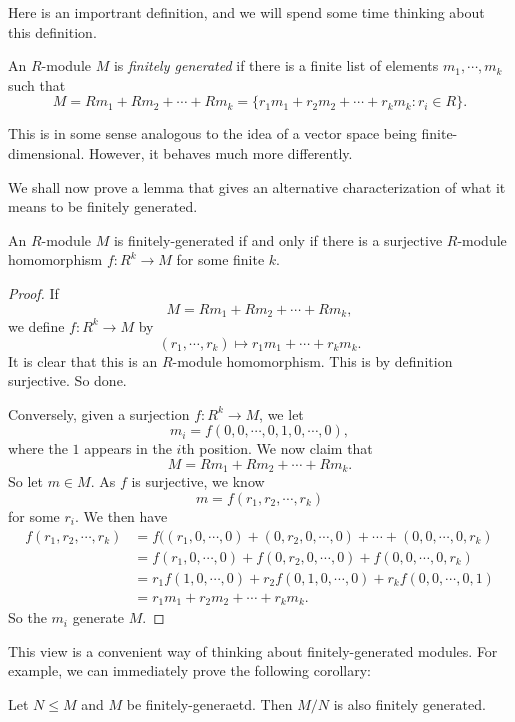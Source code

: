 \documentclass[a4paper]{article}
\begin{document}
Here is an importrant definition, and we will spend some time thinking about this definition.
\begin{defi}
  An $R$-module $M$ is \emph{finitely generated} if there is a finite list of elements $m_1, \cdots, m_k$ such that
  \[
    M = Rm_1 + Rm_2 + \cdots + Rm_k = \{r_1 m_1 + r_2 m_2 + \cdots + r_k m_k: r_i \in R\}.
  \]
\end{defi}
This is in some sense analogous to the idea of a vector space being finite-dimensional. However, it behaves much more differently.

We shall now prove a lemma that gives an alternative characterization of what it means to be finitely generated.

\begin{lemma}
  An $R$-module $M$ is finitely-generated if and only if there is a surjective $R$-module homomorphism $f: R^k \to M$ for some finite $k$.
\end{lemma}

\begin{proof}
  If
  \[
    M = R m_1 + R m_2 + \cdots + R m_k,
  \]
  we define $f: R^k \to M$ by
  \[
    (r_1, \cdots, r_k) \mapsto r_1 m_1 + \cdots + r_k m_k.
  \]
  It is clear that this is an $R$-module homomorphism. This is by definition surjective. So done.

  Conversely, given a surjection $f: R^k \to M$, we let
  \[
    m_i = f(0, 0, \cdots, 0, 1, 0, \cdots, 0),
  \]
  where the $1$ appears in the $i$th position. We now claim that
  \[
    M = R m_1 + R m_2 + \cdots + R m_k.
  \]
  So let $m \in M$. As $f$ is surjective, we know
  \[
    m = f(r_1, r_2, \cdots, r_k)
  \]
  for some $r_i$. We then have
  \begin{align*}
    f(r_1, r_2, \cdots, r_k) &= f((r_1, 0, \cdots, 0) + (0, r_2, 0, \cdots, 0) + \cdots + (0, 0, \cdots, 0, r_k)\\
    &= f(r_1, 0, \cdots, 0) + f(0, r_2, 0, \cdots, 0) + f(0, 0, \cdots, 0, r_k)\\
    &= r_1 f(1, 0, \cdots, 0) + r_2 f(0, 1, 0, \cdots, 0) + r_k f(0, 0, \cdots, 0, 1)\\
    &= r_1 m_1 + r_2 m_2 + \cdots + r_k m_k.
  \end{align*}
  So the $m_i$ generate $M$.
\end{proof}
This view is a convenient way of thinking about finitely-generated modules. For example, we can immediately prove the following corollary:

\begin{cor}
  Let $N \leq M$ and $M$ be finitely-generaetd. Then $M/N$ is also finitely generated.
\end{cor}
\end{document}
